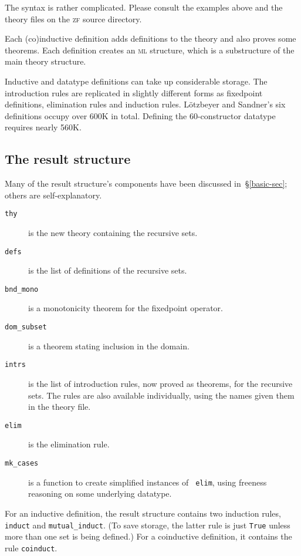 \documentclass[12pt]{article}
\begin{document}
The syntax is rather complicated.  Please consult the examples above and the
theory files on the \textsc{zf} source directory.  

Each (co)inductive definition adds definitions to the theory and also proves
some theorems.  Each definition creates an \textsc{ml} structure, which is a
substructure of the main theory structure.

Inductive and datatype definitions can take up considerable storage.  The
introduction rules are replicated in slightly different forms as fixedpoint
definitions, elimination rules and induction rules.  L\"otzbeyer and Sandner's
six definitions occupy over 600K in total.  Defining the 60-constructor
datatype requires nearly 560K\@.

\subsection{The result structure}
Many of the result structure's components have been discussed
in~\S\ref{basic-sec}; others are self-explanatory.
\begin{description}
\item[\tt thy] is the new theory containing the recursive sets.

\item[\tt defs] is the list of definitions of the recursive sets.

\item[\tt bnd\_mono] is a monotonicity theorem for the fixedpoint operator.

\item[\tt dom\_subset] is a theorem stating inclusion in the domain.

\item[\tt intrs] is the list of introduction rules, now proved as theorems, for
the recursive sets.  The rules are also available individually, using the
names given them in the theory file. 

\item[\tt elim] is the elimination rule.

\item[\tt mk\_cases] is a function to create simplified instances of {\tt
elim}, using freeness reasoning on some underlying datatype.
\end{description}

For an inductive definition, the result structure contains two induction
rules, {\tt induct} and \verb|mutual_induct|.  (To save storage, the latter
rule is just {\tt True} unless more than one set is being defined.)  For a
coinductive definition, it contains the rule \verb|coinduct|.
\end{document}
